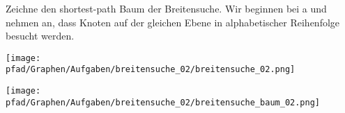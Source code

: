 ﻿\question[3]
Zeichne den shortest-path Baum der Breitensuche. Wir beginnen bei a und nehmen an,
dass Knoten auf der gleichen Ebene in alphabetischer Reihenfolge besucht werden.

\texttt{[image: \\pfad/Graphen/Aufgaben/breitensuche\_02/breitensuche\_02.png]}
\begin{solutionbox}{5cm}
\texttt{[image: \\pfad/Graphen/Aufgaben/breitensuche\_02/breitensuche\_baum\_02.png]}
\end{solutionbox}
